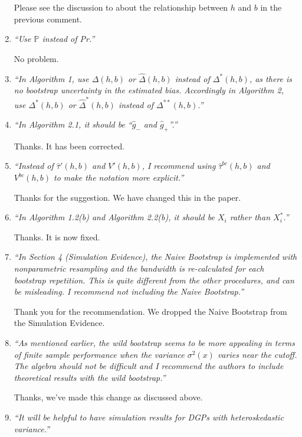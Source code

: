 \documentclass[12pt,fleqn]{article}
\begin{document}
\begin{enumerate}
Please see the discussion to about the relationship between $h$ and $b$ in the previous comment.

\item \textit{``Use $\mathbb{P}$ instead of Pr.''}

No problem.

\item \textit{``In Algorithm 1, use $\Delta(h,b)$ or $\hat{\Delta}(h,b)$ instead of $\Delta^{*}(h,b)$, as there is no bootstrap uncertainty in the estimated bias. Accordingly in Algorithm 2, use $\Delta^{*}(h,b)$ or $\hat{\Delta}^{*}(h,b)$ instead of $\Delta^{**}(h,b)$.''}


\item \textit{``In Algorithm 2.1, it should be ``$\hat{g}_{-}$ and $\hat{g}_{+}$''.''}
 
 Thanks. It has been corrected.

\item \textit{``Instead of $\hat{\tau}'(h,b)$ and $V'(h,b)$, I recommend using $\hat{\tau}^{bc}(h,b)$ and $V^{bc}(h,b)$ to make the notation more explicit.''}

Thanks for the suggestion. We have changed this in the paper.

\item \textit{``In Algorithm 1.2(b) and Algorithm 2.2(b), it should be $X_{i}$ rather than $X^{*}_{i}$.''}
 
Thanks. It is now fixed.

\item \textit{``In Section 4 (Simulation Evidence), the Naive Bootstrap is implemented with nonparametric resampling and the bandwidth is re-calculated for each bootstrap repetition.
This is quite different from the other procedures, and can be misleading. I recommend not including the Naive Bootstrap.''}

Thank you for the recommendation. We dropped the Naive Bootstrap from the Simulation Evidence.

\item \textit{``As mentioned earlier, the wild bootstrap seems to be more appealing in terms of finite sample performance when the variance $\sigma^{2}(x)$ varies near the cutoff. The algebra should not be difficult and I recommend the authors to include theoretical results with the wild bootstrap.''}

Thanks, we've made this change as discussed above.

\item \textit{``It will be helpful to have simulation results for DGPs with heteroskedastic variance.''}


\end{enumerate}
\end{document}
